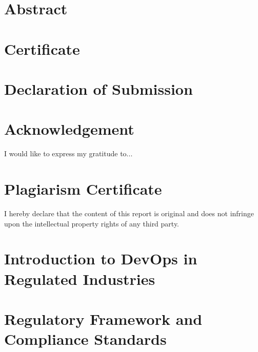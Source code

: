 \documentclass{report}[12pt]
\begin{document}
\tableofcontents

\chapter*{Abstract}

\chapter*{Certificate}

\chapter*{Declaration of Submission}

\chapter*{Acknowledgement}
I would like to express my gratitude to...

\chapter*{Plagiarism Certificate}

I hereby declare that the content of this report is original and does not infringe upon the intellectual property rights of any third party.








\chapter*{Introduction to DevOps in Regulated Industries}

\chapter*{Regulatory Framework and Compliance Standards}
\end{document}
